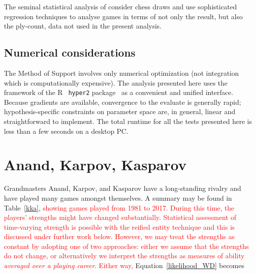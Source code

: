 \documentclass[review]{elsarticle}
\begin{document}
The seminal statistical analysis of 
\citet{moul2009} consider chess draws and use
sophisticated regression techniques to analyse games in terms of not
only the result, but also the ply-count, data not used in the present
analysis.

\subsection{Numerical considerations}

The Method of Support \citep{edwards1972} involves only numerical
optimization (not integration which is computationally expensive).
The analysis presented here uses the framework of the
R~\citep{rcore2019} {\tt hyper2} package~\citep{hankin2017} as a
convenient and unified interface.  Because gradients are available,
convergence to the evaluate is generally rapid; hypothesis-specific
constraints on parameter space are, in general, linear and
straightforward to implement.  The total runtime for all the tests
presented here is less than a few seconds on a desktop PC.

\section{Anand, Karpov, Kasparov}

Grandmasters Anand, Karpov, and Kasparov have a long-standing rivalry
and have played many games amongst themselves.  A summary may be found
in Table~\ref{kka}, \textcolor{red}{showing games played from 1981 to
  2017.  During this time, the players' strengths might have changed
  substantially.  Statistical assessment of time-varying strength is
  possible with the reified entity technique and this is discussed
  under further work below.  However, we may treat the strengths as
  constant by adopting one of two approaches: either we assume that
  the strengths do not change, or alternatively we interpret the
  strengths as measures of ability {\em averaged over a playing
    career}.  Either way,} Equation~\ref{likelihood_WD} becomes
\end{document}

